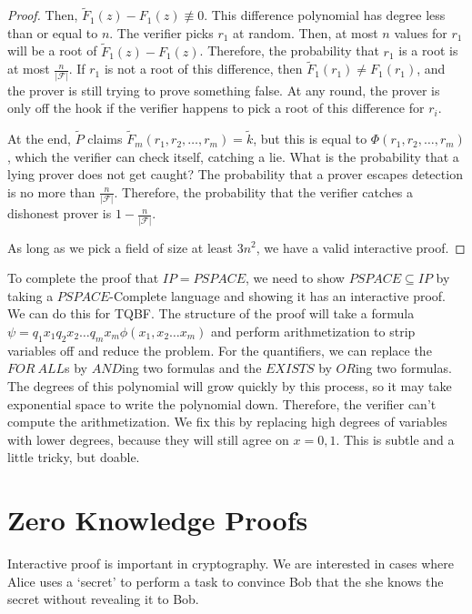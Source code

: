 \begin{proof}
Then, $\tilde{F}_1(z) - F_1(z)\not\equiv0$.  This difference polynomial has degree less than or equal to $n$.  The verifier picks $r_1$ at random.  Then, at most $n$ values for $r_1$ will be a root of $\tilde{F}_1(z) - F_1(z)$.  Therefore, the probability that $r_1$ is a root is at most $\frac{n}{|\mathcal{F}|}$.  If $r_1$ is not a root of this difference, then $\tilde{F}_1(r_1) \neq F_1(r_1)$, and the prover is still trying to prove something false.  At any round, the prover is only off the hook if the verifier happens to pick a root of this difference for $r_i$.

At the end, $\tilde{P}$ claims $\tilde{F}_m(r_1,r_2,\dots,r_m) = \tilde{k}$, but this is equal to $\Phi(r_1,r_2,\dots,r_m)$, which the verifier can check itself, catching a lie.  What is the probability that a lying prover does not get caught?  The probability that a prover escapes detection is no more than $\frac{n}{|\mathcal{F}|}$.  Therefore, the probability that the verifier catches a dishonest prover is $1-\frac{n}{|\mathcal{F}|}$.

As long as we pick a field of size at least $3n^2$, we have a valid interactive proof.

\end{proof}

To complete the proof that $IP=PSPACE$, we need to show $PSPACE\subseteq IP$ by taking a $PSPACE$-Complete language and showing it has an interactive proof.  We can do this for TQBF.  The structure of the proof will take a formula $\psi=q_1x_1q_2x_2\dots q_mx_m \phi(x_1,x_2\dots x_m)$ and perform arithmetization to strip variables off and reduce the problem.  For the quantifiers, we can replace the $FOR\ ALL$s by $AND$ing two formulas and the $EXISTS$ by $OR$ing two formulas.  The degrees of this polynomial will grow quickly by this process, so it may take exponential space to write the polynomial down.  Therefore, the verifier can't compute the arithmetization.  We fix this by replacing high degrees of variables with lower degrees, because they will still agree on $x=0,1$.  This is subtle and a little tricky, but doable.




\section*{Zero Knowledge Proofs}

Interactive proof is important in cryptography.  We are interested in cases where Alice uses a `secret' to perform a task to convince Bob that the she knows the secret without revealing it to Bob.

